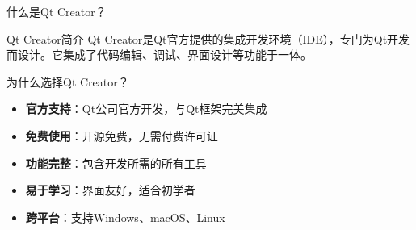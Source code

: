 \documentclass[UTF8,aspectratio=169]{beamer}
\begin{document}
\begin{frame}{什么是Qt Creator？}
    \begin{ytublock}{Qt Creator简介}
        Qt Creator是Qt官方提供的集成开发环境（IDE），专门为Qt开发而设计。它集成了代码编辑、调试、界面设计等功能于一体。
    \end{ytublock}

    \begin{ytublock}{为什么选择Qt Creator？}
        \begin{itemize}
            \item \textbf{官方支持}：Qt公司官方开发，与Qt框架完美集成
            \item \textbf{免费使用}：开源免费，无需付费许可证
            \item \textbf{功能完整}：包含开发所需的所有工具
            \item \textbf{易于学习}：界面友好，适合初学者
            \item \textbf{跨平台}：支持Windows、macOS、Linux
        \end{itemize}
    \end{ytublock}
\end{frame}
\end{document}

